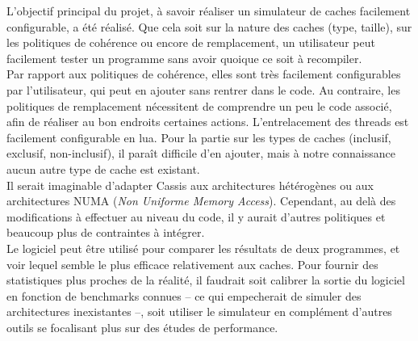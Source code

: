 L'objectif principal du projet, à savoir réaliser un simulateur de caches facilement configurable, a été réalisé. Que cela soit sur la nature des caches (type, taille), sur les politiques de cohérence ou encore de remplacement, un utilisateur peut facilement tester un programme sans avoir quoique ce soit à recompiler. \\

Par rapport aux politiques de cohérence, elles sont très facilement configurables par l'utilisateur, qui peut en ajouter sans rentrer dans le code. Au contraire, les politiques de remplacement nécessitent de comprendre un peu le code associé, afin de réaliser au bon endroits certaines actions. L'entrelacement des threads est facilement configurable en lua. Pour la partie sur les types de caches (inclusif, exclusif, non-inclusif), il paraît difficile d'en ajouter, mais à notre connaissance aucun autre type de cache est existant. \\

Il serait imaginable d'adapter \textsf{Cassis} aux architectures hétérogènes ou aux architectures NUMA (\emph{Non Uniforme Memory Access}). Cependant, au delà des modifications à effectuer au niveau du code, il y aurait d'autres politiques et beaucoup plus de contraintes à intégrer. \\

Le logiciel peut être utilisé pour comparer les résultats de deux programmes, et voir lequel semble le plus efficace relativement aux caches. Pour fournir des statistiques plus proches de la réalité, il faudrait soit calibrer la sortie du logiciel en fonction de benchmarks connues -- ce qui empecherait de simuler des architectures inexistantes --, soit utiliser le simulateur en complément d'autres outils se focalisant plus sur des études de performance.
